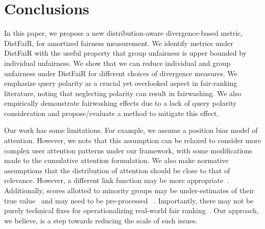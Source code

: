

\vspace{-0.7em}

\section{Conclusions}
In this paper, we propose a new distribution-aware divergence-based metric, DistFaiR, for amortized fairness measurement. We identify metrics under DistFaiR with the useful property that group unfairness is upper bounded by individual unfairness. We show that we can reduce individual and group unfairness under DistFaiR for different choices of divergence measures. We emphasize query polarity as a crucial yet overlooked aspect in fair-ranking literature, noting that neglecting polarity can result in fairwashing. We also empirically demonstrate fairwashing effects due to a lack of query polarity consideration and propose/evaluate a method to mitigate this effect. 

Our work has some limitations. For example, we assume a position bias model of attention. However, we note that this assumption can be relaxed to consider more complex user attention patterns under our framework, with some modifications made to the cumulative attention formulation. We also make normative assumptions that the distribution of attention should be close to that of relevance. However, a different link function may be more appropriate~\cite{saito2022fair}. Additionally, scores allotted to minority groups may be under-estimates of their true value~\cite{pierson2021algorithmic,krieg2022perceived} and may need to be pre-processed ~\cite{liao2023social}.  Importantly, there may not be purely technical fixes for operationalizing real-world fair ranking~\cite{gichoya2021equity}. Our approach, we believe, is a step towards reducing the scale of such issues.






